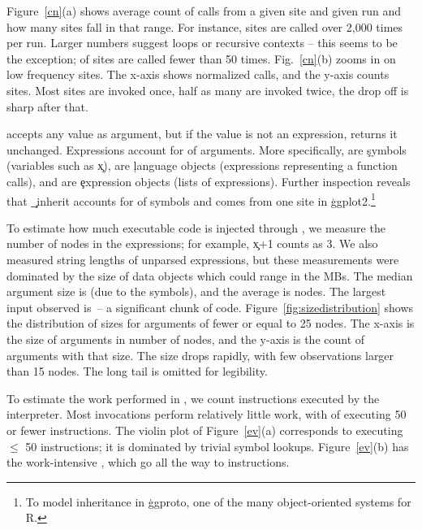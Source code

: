 \documentclass[screen,acmsmall]{acmart}%
\begin{document}
Figure~\ref{cn}(a) shows average count of calls from a given site and given run
and how many sites fall in that range. For instance, \packageRunbinh sites are
called over 2,000 times per run. Larger numbers suggest loops or recursive
contexts -- this seems to be the exception; \packageRunbina of sites are called
fewer than 50 times. Fig.~\ref{cn}(b) zooms in on low frequency sites. The
x-axis shows normalized calls, and the y-axis counts sites. Most sites are
invoked once, half as many are invoked twice, the drop off is sharp after that.

\Eval accepts any value as argument, but if the value is not an expression,
\eval returns it unchanged. Expressions account for \packageCodepercent of
arguments. More specifically, \packageSymbolpercent are \c{symbol}s (variables
such as \c{x}), \packageLanguagepercent are \c{language} objects (expressions
representing a function calls), and \packageExpressionpercent are \c{expression}
objects (lists of expressions). Further inspection reveals that \c{\_inherit}
accounts for \packageGgplotsymbolpercent of symbols and comes from one site in
\c{ggplot2}.\footnote{To model inheritance in \c{ggproto}, one of the many
object-oriented systems for R.}

To estimate how much executable code is injected through \eval, we measure the
number of nodes in the expressions; for example, \c{x+1} counts as 3. We also
measured string lengths of unparsed expressions, but these measurements were
dominated by the size of data objects which could range in the MBs. The median
argument size is \packageMedianszeval (due to the symbols), and the average is
\packageAvgszeval nodes. The largest \eval input observed is
\packageMaxszeval\,-- a significant chunk of code.
Figure~\ref{fig:sizedistribution} shows the distribution of sizes for arguments
of fewer or equal to 25 nodes. The x-axis is the size of arguments in number of
nodes, and the y-axis is the count of arguments with that size. The size drops
rapidly, with few observations larger than 15 nodes. The long tail is omitted
for legibility.


To estimate the work performed in \evals, we count instructions executed by the
interpreter. Most invocations perform relatively little work, with
\packageSmalleventspct of \evals executing 50 or fewer instructions. The violin
plot of Figure~\ref{ev}(a) corresponds to \evals executing $\leq$ 50
instructions; it is dominated by trivial symbol lookups. Figure~\ref{ev}(b) has
the work-intensive \evals, which go all the way to \packageMaxeventsRnd
instructions.
\end{document}

